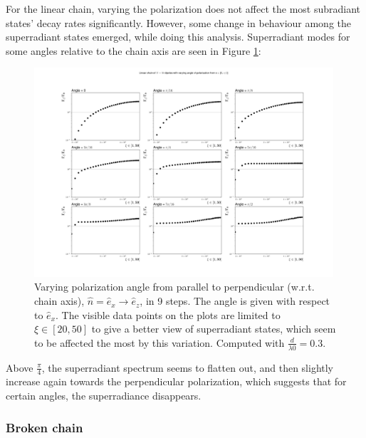 \documentclass{article}
\begin{document}
\noindent
For the linear chain, varying the polarization does not affect the most subradiant states' decay rates significantly. However, some change in behaviour among the superradiant states emerged, while doing this analysis. Superradiant modes for some angles relative to the chain axis are seen in Figure \ref{fig:linear_var_angle}:
\begin{figure}[H]
    \includegraphics[width=0.99\textwidth]{figs/case_linear_var_angle_0_pi05.png}
    \caption{Varying polarization angle from parallel to perpendicular (w.r.t. chain axis), $\hat{n} = \hat{e}_x \rightarrow \hat{e}_z$, in 9 steps. The angle is given with respect to $\hat{e}_x$. The visible data points on the plots are limited to $\xi \in [20, 50]$ to give a better view of superradiant states, which seem to be affected the most by this variation. Computed with $\frac{d}{\lambda0} = 0.3$. }
    \label{fig:linear_var_angle}
\end{figure}
Above $\frac{\pi}{4}$, the superradiant spectrum seems to flatten out, and then slightly increase again towards the perpendicular polarization, which suggests that for certain angles, the superradiance disappears. 

\subsubsection{Broken chain}\label{disc:linear_broken}
\end{document}
